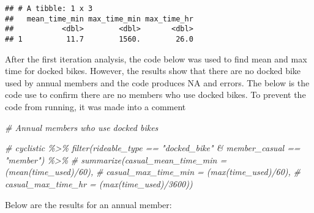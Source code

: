\documentclass[
]{article}
\newenvironment{Shaded}{\begin{snugshade}}{\end{snugshade}}
\newcommand{\CommentTok}[1]{\textcolor[rgb]{0.56,0.35,0.01}{\textit{#1}}}
\begin{document}
\begin{verbatim}
## # A tibble: 1 x 3
##   mean_time_min max_time_min max_time_hr
##           <dbl>        <dbl>       <dbl>
## 1          11.7        1560.        26.0
\end{verbatim}

After the first iteration analysis, the code below was used to find mean
and max time for docked bikes. However, the results show that there are
no docked bike used by annual members and the code produces NA and
errors. The below is the code use to confirm there are no members who
use docked bikes. To prevent the code from running, it was made into a
comment

\begin{Shaded}
\begin{Highlighting}[]
\CommentTok{\# Annual members who use docked bikes}

\CommentTok{\# cyclistic \%\textgreater{}\% filter(rideable\_type == "docked\_bike" \& member\_casual == "member") \%\textgreater{}\% }
\CommentTok{\#                                                    summarize(casual\_mean\_time\_min = (mean(time\_used)/60),}
\CommentTok{\#                                                              casual\_max\_time\_min = (max(time\_used)/60),}
\CommentTok{\#                                                              casual\_max\_time\_hr = (max(time\_used)/3600))}
\end{Highlighting}
\end{Shaded}

Below are the results for an annual member:
\end{document}
